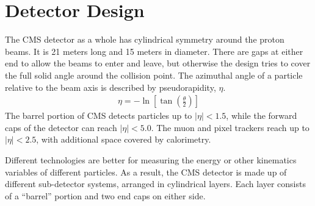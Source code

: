 \section{Detector Design} \label{sec:design}

The CMS detector as a whole has cylindrical symmetry around the proton beams.
It is 21 meters long and 15 meters in diameter.
There are gaps at either end to allow the beams to enter and leave,
but otherwise the design tries to cover the full solid angle around the collision point.
The azimuthal angle of a particle relative to the beam axis is described
by pseudorapidity, $\eta$.
\begin{gather}
  \eta = -\ln \left[\tan \left( \frac \theta 2 \right) \right]
\end{gather}
The barrel portion of CMS detects particles up to $|\eta| < 1.5$,
while the forward caps of the detector can reach $|\eta| < 5.0$.
The muon and pixel trackers reach up to $|\eta| < 2.5$,
with additional space covered by calorimetry.

Different technologies are better for measuring the energy
or other kinematics variables of different particles.
As a result, the CMS detector is made up of different sub-detector systems,
arranged in cylindrical layers.
Each layer consists of a ``barrel'' portion and two end caps on either side.


